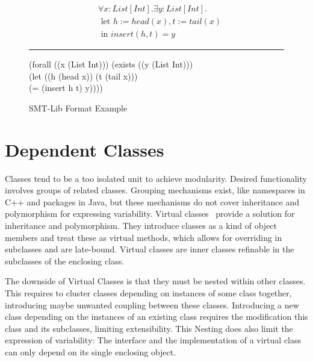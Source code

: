 \begin{figure}
\begin{align*}
&\forall x: \mathit{List[Int]}. \exists y: \mathit{List[Int]}. \\
&\text{ let } h := head(x), t := tail(x)\\
&\text{ in } insert(h, t) = y
\end{align*}
\hrule
\begin{center}
(forall ((x (List Int))) (exists ((y (List Int))) \\
(let ((h (head x)) (t (tail x))) \\
(= (insert h t) y))))
\caption{SMT-Lib Format Example}
\label{fig:smtlib-example}
\end{center}
\end{figure}

\section{Dependent Classes}
\label{sec:depcls}
Classes tend to be a too isolated unit to achieve modularity.
Desired functionality involves groups of related classes.
Grouping mechanisms exist, like namespaces in C++ and packages in Java,
but these mechanisms do not cover inheritance and polymorphism for expressing variability.
Virtual classes~\cite{virtual:classes, vaidas:thesis} provide a solution for inheritance and polymorphism.
They introduce classes as a kind of object members and treat these as virtual methods,
which allows for overriding in subclasses and are late-bound.
Virtual classes are inner classes refinable in the subclasses of the enclosing class.

The downside of Virtual Classes is that they must be nested within other classes.
This requires to cluster classes depending on instances of some class together,
introducing maybe unwanted coupling between these classes.
Introducing a new class depending on the instances of an existing class
requires the modification this class and its subclasses,
limiting extensibility.
This Nesting does also limit the expression of variability:
The interface and the implementation of a virtual class can only depend
on its single enclosing object.


